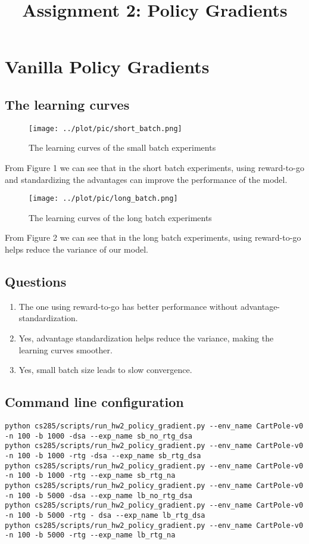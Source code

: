 \documentclass[10pt, a4paper]{ctexart}
\begin{document}
\title{Assignment 2: Policy Gradients}
\date{}
\author{}
\maketitle

\section{Vanilla Policy Gradients}
\subsection{The learning curves}
\begin{figure}
    \centering
    \texttt{[image: ../plot/pic/short\_batch.png]}
    \caption{The learning curves of the small batch experiments}
\end{figure}
From Figure 1 we can see that in the short batch experiments, using reward-to-go and standardizing the advantages can improve the performance of the model.\par
\begin{figure}
    \centering
    \texttt{[image: ../plot/pic/long\_batch.png]}
    \caption{The learning curves of the long batch experiments}
\end{figure}
From Figure 2 we can see that in the long batch experiments, using reward-to-go helps reduce the variance of our model.
\subsection{Questions}
\begin{enumerate}
    \item The one using reward-to-go has better performance without advantage-standardization.
    \item Yes, advantage standardization helps reduce the variance, making the learning curves smoother.
    \item Yes, small batch size leads to slow convergence.
\end{enumerate}
\subsection{Command line configuration}
\begin{lstlisting}[breaklines=true,keywordstyle=\color{blue!90}\bfseries]
python cs285/scripts/run_hw2_policy_gradient.py --env_name CartPole-v0 -n 100 -b 1000 -dsa --exp_name sb_no_rtg_dsa
python cs285/scripts/run_hw2_policy_gradient.py --env_name CartPole-v0 -n 100 -b 1000 -rtg -dsa --exp_name sb_rtg_dsa
python cs285/scripts/run_hw2_policy_gradient.py --env_name CartPole-v0 -n 100 -b 1000 -rtg --exp_name sb_rtg_na
python cs285/scripts/run_hw2_policy_gradient.py --env_name CartPole-v0 -n 100 -b 5000 -dsa --exp_name lb_no_rtg_dsa
python cs285/scripts/run_hw2_policy_gradient.py --env_name CartPole-v0 -n 100 -b 5000 -rtg - dsa --exp_name lb_rtg_dsa
python cs285/scripts/run_hw2_policy_gradient.py --env_name CartPole-v0 -n 100 -b 5000 -rtg --exp_name lb_rtg_na
\end{lstlisting}
\end{document}
